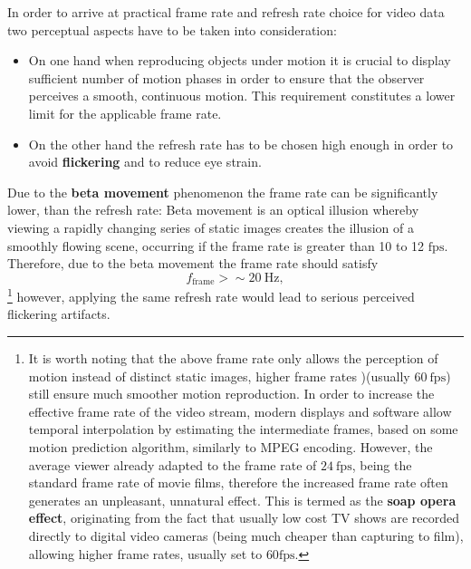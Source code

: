 In order to arrive at practical frame rate and refresh rate choice for video data two perceptual aspects have to be taken into consideration:
\begin{itemize}
\item On one hand when reproducing objects under motion it is crucial to display sufficient number of motion phases in order to ensure that the observer perceives a smooth, continuous motion.
This requirement constitutes a lower limit for the applicable frame rate.
\item On the other hand the refresh rate has to be chosen high enough in order to avoid \textbf{flickering} and to reduce eye strain.
\end{itemize}
Due to the \textbf{beta movement} phenomenon the frame rate can be significantly lower, than the refresh rate:
Beta movement is an optical illusion whereby viewing a rapidly changing series of static images creates the illusion of a smoothly flowing scene, occurring if the frame rate is greater than 10 to 12 $\mathrm{fps}$. 
Therefore, due to the beta movement the frame rate should satisfy
\begin{equation}
f_{\mathrm{frame}} > \sim20~\mathrm{Hz},
\end{equation}
\footnote{
It is worth noting that the above frame rate only allows the perception of motion instead of distinct static images, higher frame rates )(usually $60~\mathrm{fps}$) still ensure much smoother motion reproduction.
In order to increase the effective frame rate of the video stream, modern displays and software allow temporal interpolation by estimating the intermediate frames, based on some motion prediction algorithm, similarly to MPEG encoding.
However, the average viewer already adapted to the frame rate of $24~\mathrm{fps}$, being the standard frame rate of movie films, therefore the increased frame rate often generates an unpleasant, unnatural effect.
This is termed as the \textbf{soap opera effect}, originating from the fact that usually low cost TV shows are recorded directly to digital video cameras (being much cheaper than capturing to film), allowing higher frame rates, usually set to $60 \mathrm{fps}$.}
however, applying the same refresh rate would lead to serious perceived flickering artifacts.

